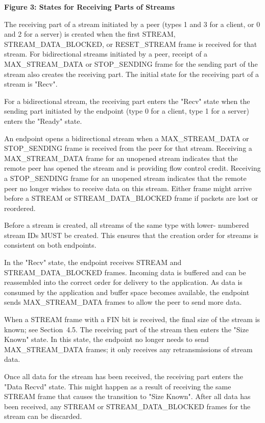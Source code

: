 \documentclass{article}
\begin{document}
\begin{center}
\textbf{Figure 3: States for Receiving Parts of Streams}
\end{center}

The receiving part of a stream initiated by a peer (types 1 and 3 for a client, or 0 and 2 for a server) is created when the first STREAM, STREAM\_DATA\_BLOCKED, or RESET\_STREAM frame is received for that stream.  For bidirectional streams initiated by a peer, receipt of a MAX\_STREAM\_DATA or STOP\_SENDING frame for the sending part of the stream also creates the receiving part.  The initial state for the receiving part of a stream is "Recv".

For a bidirectional stream, the receiving part enters the "Recv" state when the sending part initiated by the endpoint (type 0 for a client, type 1 for a server) enters the "Ready" state.

An endpoint opens a bidirectional stream when a MAX\_STREAM\_DATA or STOP\_SENDING frame is received from the peer for that stream. Receiving a MAX\_STREAM\_DATA frame for an unopened stream indicates that the remote peer has opened the stream and is providing flow control credit.  Receiving a STOP\_SENDING frame for an unopened stream indicates that the remote peer no longer wishes to receive data on this stream.  Either frame might arrive before a STREAM or STREAM\_DATA\_BLOCKED frame if packets are lost or reordered.

Before a stream is created, all streams of the same type with lower- numbered stream IDs MUST be created.  This ensures that the creation order for streams is consistent on both endpoints.

In the "Recv" state, the endpoint receives STREAM and STREAM\_DATA\_BLOCKED frames.  Incoming data is buffered and can be reassembled into the correct order for delivery to the application. As data is consumed by the application and buffer space becomes available, the endpoint sends MAX\_STREAM\_DATA frames to allow the peer to send more data.

When a STREAM frame with a FIN bit is received, the final size of the stream is known; see Section~4.5.  The receiving part of the stream then enters the "Size Known" state.  In this state, the endpoint no longer needs to send MAX\_STREAM\_DATA frames; it only receives any retransmissions of stream data.

Once all data for the stream has been received, the receiving part enters the "Data Recvd" state.  This might happen as a result of receiving the same STREAM frame that causes the transition to "Size Known".  After all data has been received, any STREAM or STREAM\_DATA\_BLOCKED frames for the stream can be discarded.
\end{document}
